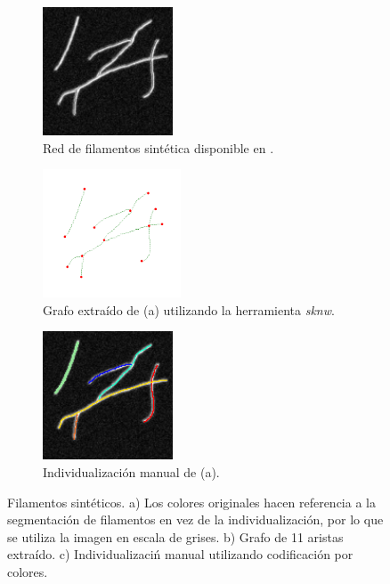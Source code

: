  \begin{figure}[h!]
    \centering
    \begin{subfigure}[t]{0.3\textwidth}
        \centering
        \includegraphics[height=1.5in]{benchImages/Synth-QuantitativeIFS-Fig7_gray.png}
        \caption{Red de filamentos sint\'etica disponible en \cite{qiu2014quantitative}.}
        \label{fig:synth-QFS-7-original}
    \end{subfigure}%
    \hspace{0.5cm}
    \begin{subfigure}[t]{0.3\textwidth}
        \centering
        \includegraphics[height=1.5in]{benchImages/Synth-QuantitativeIFS-Fig7_graph_labeled_thick.png}
        \caption{Grafo extra\'ido de (a) utilizando la herramienta {\it sknw}.}
        \label{fig:synth-QFS-7-graph}
    \end{subfigure}
    \hspace{0.5cm}
    \begin{subfigure}[t]{0.3\textwidth}
        \centering
        \includegraphics[height=1.5in]{benchImages/Synth-QuantitativeIFS-Fig7_groundTruth.png}
        \caption{Individualizaci\'on manual de (a).}
        \label{fig:synth-QFS-7-gt}
    \end{subfigure}
    \caption{Filamentos sint\'eticos. a) Los colores originales hacen referencia a la segmentaci\'on de filamentos en vez de la individualizaci\'on, por lo que se utiliza la imagen en escala de grises. b) Grafo de 11 aristas extra\'ido. c) Individualizaci\'n manual utilizando codificaci\'on por colores.}
    \label{fig:synth-QFS-7}
\end{figure}


